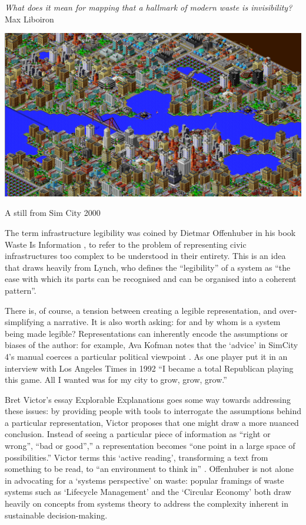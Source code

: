 \documentclass[nofonts,nols,justified,nobib]{tufte-book}
\begin{document}
\begin{flushright}
\emph{What does it mean for mapping that a hallmark of modern waste is invisibility?}
\cite{liboiron_mapping_2014}\\
Max Liboiron
\end{flushright}

\begin{marginfigure}
\includegraphics[width=\textwidth]{img/1/sim-city.png}
\caption{A still from Sim City 2000 \label{b}}
\end{marginfigure}


The term infrastructure legibility was coined by Dietmar Offenhuber in his book Waste Is Information \cite{offenhuber_waste_2017}, to refer to the problem of representing civic infrastructures too complex to be understood in their entirety. This is an idea that draws heavily from Lynch, who defines the ``legibility'' of a system as ``the ease with which its parts can be recognised and can be organised into a coherent pattern''. 


There is, of course, a tension between creating a legible representation, and over-simplifying a narrative. It is also worth asking: for and by whom is a system being made legible? Representations can inherently encode the assumptions or biases of the author: for example, Ava Kofman notes that the `advice' in SimCity 4's manual coerces a particular political viewpoint \cite{kofman_les_2014}. As one player put it in an interview with Los Angeles Times in 1992 ``I became a total Republican playing this game. All I wanted was for my city to grow, grow, grow.''\cite{Baker_model_2019}


Bret Victor's essay Explorable Explanations goes some way towards addressing these issues: by providing people with tools to interrogate the assumptions behind a particular representation, Victor proposes that one might draw a more nuanced conclusion. Instead of seeing a particular piece of information as ``right or wrong'', ``bad or good'','' a representation becomes ``one point in a large space of possibilities.'' Victor terms this `active reading', transforming a text from something to be read, to ``an environment to think in'' \cite{victor_explorable_2011}. Offenhuber is not alone in advocating for a `systems perspective' on waste: popular framings of waste systems such as `Lifecycle Management' and the `Circular Economy' both draw heavily on concepts from systems theory to address the complexity inherent in sustainable decision-making.
\end{document}
